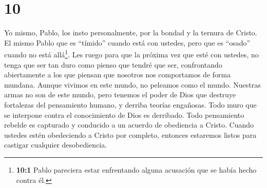 \hypertarget{section-9}{%
\section{10}\label{section-9}}

 Yo mismo, Pablo, los insto personalmente, por la bondad y
la ternura de Cristo. El mismo Pablo que es ``tímido'' cuando está con
ustedes, pero que es ``osado'' cuando no está allá\footnote{\textbf{10:1}
  Pablo pareciera estar enfrentando alguna acusación que se había hecho
  contra él.}.  Les ruego para que la próxima vez que esté
con ustedes, no tenga que ser tan duro como pienso que tendré que ser,
confrontando abiertamente a los que piensan que nosotros nos comportamos
de forma mundana.  Aunque vivimos en este mundo, no peleamos
como el mundo.  Nuestras armas no son de este mundo, pero
tenemos el poder de Dios que destruye fortalezas del pensamiento humano,
y derriba teorías engañosas.  Todo muro que se interpone
contra el conocimiento de Dios es derribado. Todo pensamiento rebelde es
capturado y conducido a un acuerdo de obediencia a Cristo. 
Cuando ustedes estén obedeciendo a Cristo por completo, entonces
estaremos listos para castigar cualquier desobediencia.

